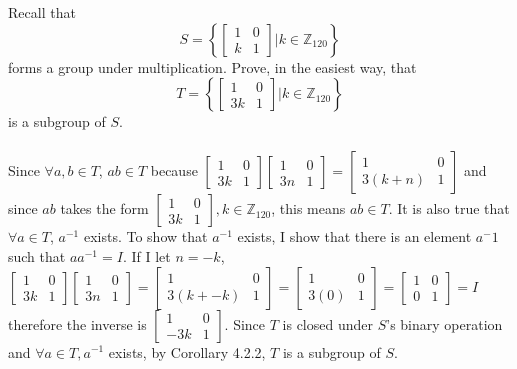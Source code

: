 \documentclass[titlepage]{article}
\newenvironment{problem}[2][Problem]{\begin{trivlist}
\item[\hskip \labelsep {\bfseries #1}\hskip \labelsep {\bfseries #2.}]}{\end{trivlist}}
\begin{document}
\begin{problem}{2}
Recall that
$$ S = \left\{\begin{bmatrix}1&0\\k&1\end{bmatrix} \bigg| k \in \mathbb{Z}_{120}\right\}$$
forms a group under multiplication. Prove, in the easiest way, that
$$T = \left\{ \begin{bmatrix} 1 & 0 \\ 3k & 1 \end{bmatrix} \bigg| k \in \mathbb{Z}_{120} \right\}$$
is a subgroup of $S$.
\\
\\
Since $\forall a,b \in T$, $ab\in T$ because $\begin{bmatrix}1&0 \\ 3k & 1\end{bmatrix} \begin{bmatrix}1 & 0 \\ 3n & 1 \end{bmatrix} = \begin{bmatrix}1 & 0 \\ 3(k+n) & 1 \end{bmatrix}$ and since $ab$ takes the form $\begin{bmatrix} 1 & 0 \\ 3k & 1 \end{bmatrix}, k \in \mathbb{Z}_{120}$, this means $ab \in T$. It is also true that $\forall a \in T $, $a^{-1}$ exists. To show that $a^{-1}$ exists, I show that there is an element $a^-1$ such that $aa^{-1} = I$. If I let $n = -k$, $\begin{bmatrix}1&0 \\ 3k & 1\end{bmatrix} \begin{bmatrix}1 & 0 \\ 3n & 1 \end{bmatrix} = \begin{bmatrix}1 & 0 \\ 3(k+-k) & 1 \end{bmatrix} = \begin{bmatrix}1 & 0 \\ 3(0) & 1 \end{bmatrix} = \begin{bmatrix}1 & 0 \\ 0 & 1 \end{bmatrix} = I $ therefore the inverse is $\begin{bmatrix}1&0\\-3k&1 \end{bmatrix}$. Since $T$ is closed under $S$'s binary operation and $\forall a \in T, a^{-1}$ exists, by Corollary 4.2.2, $T$ is a subgroup of $S$.
\end{problem}
\end{document}
